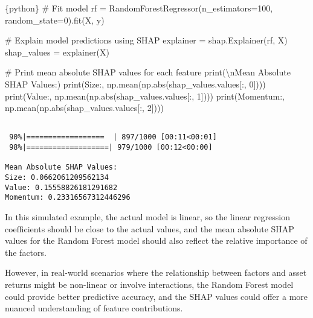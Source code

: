 \documentclass[
  letterpaper,
  DIV=11,
  numbers=noendperiod]{scrartcl}
\newenvironment{Shaded}{\begin{snugshade}}{\end{snugshade}}
\newcommand{\BuiltInTok}[1]{\textcolor[rgb]{0.00,0.23,0.31}{#1}}
\newcommand{\CharTok}[1]{\textcolor[rgb]{0.13,0.47,0.30}{#1}}
\newcommand{\CommentTok}[1]{\textcolor[rgb]{0.37,0.37,0.37}{#1}}
\newcommand{\DecValTok}[1]{\textcolor[rgb]{0.68,0.00,0.00}{#1}}
\newcommand{\InformationTok}[1]{\textcolor[rgb]{0.37,0.37,0.37}{#1}}
\newcommand{\NormalTok}[1]{\textcolor[rgb]{0.00,0.23,0.31}{#1}}
\newcommand{\OperatorTok}[1]{\textcolor[rgb]{0.37,0.37,0.37}{#1}}
\newcommand{\StringTok}[1]{\textcolor[rgb]{0.13,0.47,0.30}{#1}}
\begin{document}
\begin{Shaded}
\begin{Highlighting}[]
\InformationTok{\textasciigrave{}\textasciigrave{}\textasciigrave{}\{python\}}
\CommentTok{\# Fit model}
\NormalTok{rf }\OperatorTok{=}\NormalTok{ RandomForestRegressor(n\_estimators}\OperatorTok{=}\DecValTok{100}\NormalTok{, random\_state}\OperatorTok{=}\DecValTok{0}\NormalTok{).fit(X, y)}

\CommentTok{\# Explain model predictions using SHAP}
\NormalTok{explainer }\OperatorTok{=}\NormalTok{ shap.Explainer(rf, X)}
\NormalTok{shap\_values }\OperatorTok{=}\NormalTok{ explainer(X)}

\CommentTok{\# Print mean absolute SHAP values for each feature}
\BuiltInTok{print}\NormalTok{(}\StringTok{\textquotesingle{}}\CharTok{\textbackslash{}n}\StringTok{Mean Absolute SHAP Values:\textquotesingle{}}\NormalTok{)}
\BuiltInTok{print}\NormalTok{(}\StringTok{\textquotesingle{}Size:\textquotesingle{}}\NormalTok{, np.mean(np.}\BuiltInTok{abs}\NormalTok{(shap\_values.values[:, }\DecValTok{0}\NormalTok{])))}
\BuiltInTok{print}\NormalTok{(}\StringTok{\textquotesingle{}Value:\textquotesingle{}}\NormalTok{, np.mean(np.}\BuiltInTok{abs}\NormalTok{(shap\_values.values[:, }\DecValTok{1}\NormalTok{])))}
\BuiltInTok{print}\NormalTok{(}\StringTok{\textquotesingle{}Momentum:\textquotesingle{}}\NormalTok{, np.mean(np.}\BuiltInTok{abs}\NormalTok{(shap\_values.values[:, }\DecValTok{2}\NormalTok{])))}
\InformationTok{\textasciigrave{}\textasciigrave{}\textasciigrave{}}
\end{Highlighting}
\end{Shaded}

\begin{verbatim}

 90%|==================  | 897/1000 [00:11<00:01]       
 98%|===================| 979/1000 [00:12<00:00]       

Mean Absolute SHAP Values:
Size: 0.0662061209562134
Value: 0.15558826181291682
Momentum: 0.23316567312446296
\end{verbatim}

In this simulated example, the actual model is linear, so the linear
regression coefficients should be close to the actual values, and the
mean absolute SHAP values for the Random Forest model should also
reflect the relative importance of the factors.

However, in real-world scenarios where the relationship between factors
and asset returns might be non-linear or involve interactions, the
Random Forest model could provide better predictive accuracy, and the
SHAP values could offer a more nuanced understanding of feature
contributions.
\end{document}
